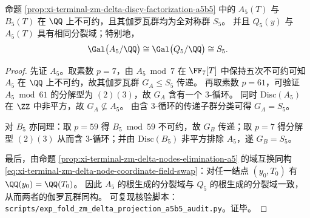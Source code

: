 \begin{theorem}[两个五次多项式的全对称算术单值化与分裂域一致]\label{thm:xi-terminal-zm-delta-a5-b5-galois-s5}
命题 \ref{prop:xi-terminal-zm-delta-discy-factorization-a5b5} 中的 \(A_5(T)\) 与 \(B_5(T)\) 在 \(\QQ\) 上不可约，且其伽罗瓦群均为全对称群 \(S_5\)。
并且 \(Q_5(y)\) 与 \(A_5(T)\) 具有相同分裂域；特别地，
\[
\Gal\bigl(A_5/\QQ\bigr)\cong \Gal\bigl(Q_5/\QQ\bigr)\cong S_5.
\]
\end{theorem}
\begin{proof}
先证 \(A_5\)。取素数 \(p=7\)，由 \(A_5\bmod 7\) 在 \(\FF_7[T]\) 中保持五次不可约可知 \(A_5\) 在 \(\QQ\) 上不可约，故其伽罗瓦群 \(G_A\le S_5\) 传递。
再取素数 \(p=61\)，可验证 \(A_5\bmod 61\) 的分解型为 \((2)(3)\)，故 \(G_A\) 含有一个 \(3\)-循环。
同时 \(\mathrm{Disc}(A_5)\) 在 \(\ZZ\) 中非平方，故 \(G_A\nsubseteq A_5\)。
由含 \(3\)-循环的传递子群分类可得 \(G_A=S_5\)。
\par
对 \(B_5\) 亦同理：取 \(p=59\) 得 \(B_5\bmod 59\) 不可约，故 \(G_B\) 传递；取 \(p=7\) 得分解型 \((2)(3)\) 从而含 \(3\)-循环；并由 \(\mathrm{Disc}(B_5)\) 非平方排除 \(A_5\)，遂 \(G_B=S_5\)。
\par
最后，由命题 \ref{prop:xi-terminal-zm-delta-nodes-elimination-a5} 的域互换同构 \eqref{eq:xi-terminal-zm-delta-node-coordinate-field-swap}：对任一结点 \((y_0,T_0)\) 有 \(\QQ(y_0)=\QQ(T_0)\)。
因此 \(A_5\) 的根生成的分裂域与 \(Q_5\) 的根生成的分裂域一致，从而两者的伽罗瓦群同构。
可复现核验脚本：\texttt{scripts/exp\_fold\_zm\_delta\_projection\_a5b5\_audit.py}。证毕。
\end{proof}


